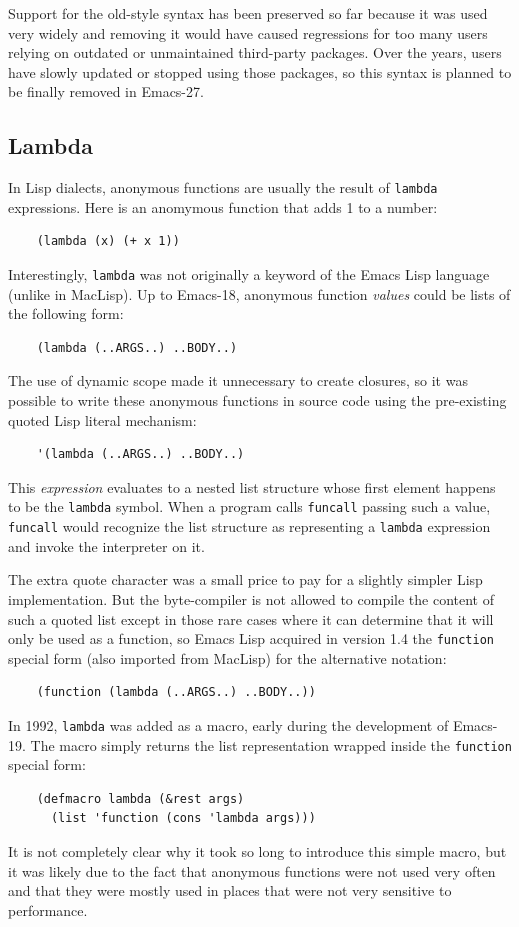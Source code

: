\documentclass[format=acmsmall, review]{acmart}
\newcommand \Elisp {Emacs Lisp}
\begin{document}
Support for the old-style syntax has been preserved so far because it was
used very widely and removing it would have caused regressions for too many
users relying on outdated or unmaintained third-party packages.  Over the
years, users have slowly updated or stopped using those packages, so this
syntax is planned to be finally removed in Emacs-27.

\subsection{Lambda}
\label{sec:lambda}

In Lisp dialects, anonymous functions are usually the result of
\texttt{lambda} expressions.  Here is an anomymous function that adds
1 to a number:
%
\begin{verbatim}
    (lambda (x) (+ x 1))
\end{verbatim}
%
Interestingly, \texttt{lambda} was not originally a keyword of the
\Elisp{} language (unlike in MacLisp).  Up to Emacs-18, anonymous
function \emph{values} could be lists of the following form:
%
\begin{verbatim}
    (lambda (..ARGS..) ..BODY..)
\end{verbatim}
%
The use of dynamic scope made it unnecessary to create closures, so it was
possible to write these anonymous functions in source code using the
pre-existing quoted Lisp literal mechanism:
%
\begin{verbatim}
    '(lambda (..ARGS..) ..BODY..)
\end{verbatim}
%
This \emph{expression} evaluates to a nested list structure whose first
element happens to be the \texttt{lambda} symbol.  When a program calls
\texttt{funcall} passing such a value, \texttt{funcall} would
recognize the list structure as representing a \texttt{lambda}
expression and invoke the interpreter on it.

The extra quote character was a small price to pay for a slightly simpler
Lisp implementation.  But the byte-compiler is not allowed to compile the
content of such a quoted list except in those rare cases where it can
determine that it will only be used as a function, so \Elisp{} acquired in
version 1.4 the \texttt{function} special form (also imported from MacLisp)
for the alternative notation:
%
\begin{verbatim}
    (function (lambda (..ARGS..) ..BODY..))
\end{verbatim}
%
In 1992, \texttt{lambda} was added as a macro, early during the
development of Emacs-19.  The macro simply returns the list representation
wrapped inside the \texttt{function} special form:
\begin{verbatim}
    (defmacro lambda (&rest args)
      (list 'function (cons 'lambda args)))
\end{verbatim}
It is not completely
clear why it took so long to introduce this simple macro, but it was likely
due to the fact that anonymous functions were not used very often and that
they were mostly used in places that were not very sensitive to performance.
\end{document}
